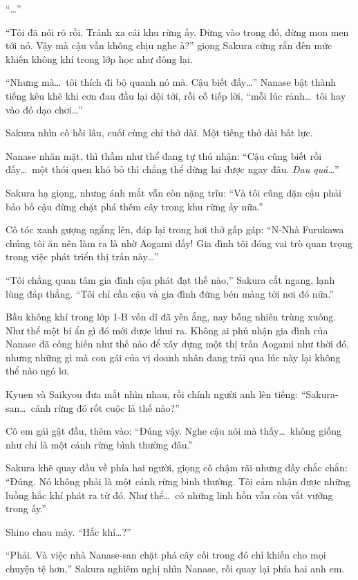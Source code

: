 \documentclass[../main.tex]{subfiles}
\begin{document}
``\dots''

``Tôi đã nói rõ rồi. Tránh xa cái khu rừng ấy. Đừng vào trong đó, đừng mon men tới nó. Vậy mà cậu vẫn không chịu nghe à?'' giọng Sakura cứng rắn đến mức khiến không khí trong lớp học như đông lại.

``Nhưng mà\dots\ tôi thích đi bộ quanh nó mà. Cậu biết đấy\dots'' Nanase bật thành tiếng kêu khẽ khi cơn đau đầu lại dội tới, rồi cố tiếp lời, ``mỗi lúc rảnh\dots\ tôi hay vào đó dạo chơi\dots''

Sakura nhìn cô hồi lâu, cuối cùng chỉ thở dài. Một tiếng thở dài bất lực.

Nanase nhăn mặt, thì thầm như thể đang tự thú nhận: ``Cậu cũng biết rồi đấy\dots\ một thói quen khó bỏ thì chẳng thể dừng lại được ngay đâu. \textit{Đau quá\dots}''

Sakura hạ giọng, nhưng ánh mắt vẫn còn nặng trĩu: ``Và tôi cũng dặn cậu phải bảo bố cậu đừng chặt phá thêm cây trong khu rừng ấy nữa.''


Cô tóc xanh gượng ngẩng lên, đáp lại trong hơi thở gấp gáp: ``N-Nhà Furukawa chúng tôi ăn nên làm ra là nhờ Aogami đấy! Gia đình tôi đóng vai trò quan trọng trong việc phát triển thị trấn này\dots''

``Tôi chẳng quan tâm gia đình cậu phát đạt thế nào,'' Sakura cắt ngang, lạnh lùng đáp thẳng. ``Tôi chỉ cần cậu và gia đình đừng bén mảng tới nơi đó nữa.''

Bầu không khí trong lớp 1-B vốn dĩ đã yên ắng, nay bỗng nhiên trùng xuống. Như thể một bí ẩn gì đó mới được khui ra. Không ai phủ nhận gia đình của Nanase đã cống hiến như thế nào để xây dựng một thị trấn Aogami như thời đó, nhưng những gì mà con gái của vị doanh nhân đang trải qua lúc này lại không thể nào ngó lơ.

Kyuen và Saikyou đưa mắt nhìn nhau, rồi chính người anh lên tiếng: ``Sakura-san\dots\ cánh rừng đó rốt cuộc là thế nào?''

Cô em gái gật đầu, thêm vào: ``Đúng vậy. Nghe cậu nói mà thấy\dots\ không giống như chỉ là một cánh rừng bình thường đâu.''

Sakura khẽ quay đầu về phía hai người, giọng cô chậm rãi nhưng đầy chắc chắn: ``Đúng. Nó không phải là một cánh rừng bình thường. Tôi cảm nhận được những luồng hắc khí phát ra từ đó. Như thể\dots\ có những linh hồn vẫn còn vất vưởng trong ấy.''

Shino chau mày. ``Hắc khí\dots?''

``Phải. Và việc nhà Nanase-san chặt phá cây cối trong đó chỉ khiến cho mọi chuyện tệ hơn,'' Sakura nghiêm nghị nhìn Nanase, rồi quay lại phía hai anh em.
\end{document}

